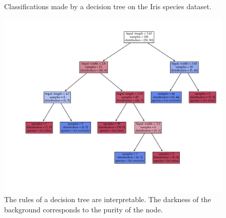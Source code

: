 \begin{figure}[tb]
	\hfill
	\caption{Classifications made by a decision tree on the Iris species dataset.}\label{fig:tree}
\end{figure}

\begin{figure}[p] %
	\centering
	\includegraphics[width=1.\textwidth]{machine_learning/figures/tree}
	\caption{The rules of a decision tree are interpretable.
	The darkness of the background corresponds to the purity of the node.\label{subfig:tree_explained}
	}
\end{figure}



